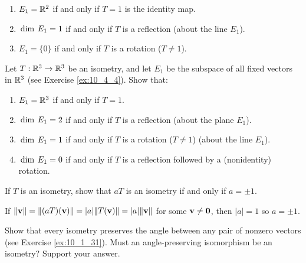 \begin{multicols}{2}
\begin{ex}
\begin{enumerate}[label={\alph*.}]
\item $E_{1} = \mathbb{R}^2$ if and only if $T = 1$ is the identity map.

\item $\thinspace\operatorname{dim\medspace} E_{1} = 1$ if and only if $T$ is a reflection (about the line $E_{1}$).

\item $E_{1} = \{0\}$ if and only if $T$ is a rotation ($T \neq 1$).

\end{enumerate}
\end{ex}

\begin{ex}
Let $T : \mathbb{R}^3 \to \mathbb{R}^3$ be an isometry, and let $E_{1}$ be the subspace of all fixed vectors in $\mathbb{R}^3$ (see Exercise \ref{ex:10_4_4}). Show that:

\begin{enumerate}[label={\alph*.}]
\item $E_{1} = \mathbb{R}^3$ if and only if $T = 1$.

\item $\thinspace\operatorname{dim\medspace} E_{1} = 2$ if and only if $T$ is a reflection (about the plane $E_{1}$).

\item $\thinspace\operatorname{dim\medspace} E_{1} = 1$ if and only if $T$ is a rotation ($T \neq 1$) (about the line $E_{1}$).

\item $\thinspace\operatorname{dim\medspace} E_{1} = 0$ if and only if $T$ is a reflection followed by a (nonidentity) rotation.

\end{enumerate}
\end{ex}

\begin{ex}
If $T$ is an isometry, show that $aT$ is an isometry if and only if $a = \pm 1$.

\begin{sol}
If $\|\textbf{v}\| = \| (aT) (\textbf{v})\| =
|a|\| T(\textbf{v})\| =
|a|\|\textbf{v}\|$ for some $\textbf{v} \neq \textbf{0}$, then $|a| = 1$ so $a = \pm 1$.
\end{sol}
\end{ex}

\begin{ex}
Show that every isometry preserves the angle between any pair of nonzero vectors (see Exercise \ref{ex:10_1_31}). Must an angle-preserving isomorphism be an isometry? Support your answer.
\end{ex}


\end{multicols}
